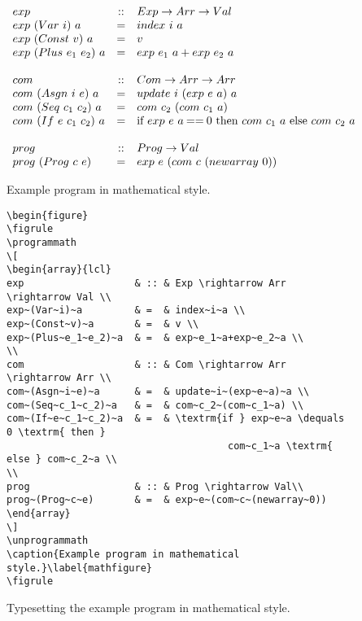 \documentclass{jfp}
\begin{document}
\begin{figure}
\figrule
\programmath
\[
\begin{array}{lcl}
exp                   & :: & Exp \rightarrow Arr \rightarrow Val \\
exp~(Var~i)~a         & =  & index~i~a \\
exp~(Const~v)~a       & =  & v \\
exp~(Plus~e_1~e_2)~a  & =  & exp~e_1~a+exp~e_2~a \\
\\
com                   & :: & Com \rightarrow Arr \rightarrow Arr \\
com~(Asgn~i~e)~a      & =  & update~i~(exp~e~a)~a \\
com~(Seq~c_1~c_2)~a   & =  & com~c_2~(com~c_1~a) \\
com~(If~e~c_1~c_2)~a  & =  & \textrm{if } exp~e~a \mathbin{==} 0 \textrm{ then }
                                      com~c_1~a \textrm{ else } com~c_2~a \\
\\
prog                  & :: & Prog \rightarrow Val\\
prog~(Prog~c~e)       & =  & exp~e~(com~c~(newarray~0))
\end{array}
\]
\unprogrammath
\caption{Example program in mathematical style.}\label{mathfigure}
\figrule
\begin{center}
\begin{verbatim}
\begin{figure}
\figrule
\programmath
\[
\begin{array}{lcl}
exp                   & :: & Exp \rightarrow Arr \rightarrow Val \\
exp~(Var~i)~a         & =  & index~i~a \\
exp~(Const~v)~a       & =  & v \\
exp~(Plus~e_1~e_2)~a  & =  & exp~e_1~a+exp~e_2~a \\
\\
com                   & :: & Com \rightarrow Arr \rightarrow Arr \\
com~(Asgn~i~e)~a      & =  & update~i~(exp~e~a)~a \\
com~(Seq~c_1~c_2)~a   & =  & com~c_2~(com~c_1~a) \\
com~(If~e~c_1~c_2)~a  & =  & \textrm{if } exp~e~a \dequals 0 \textrm{ then }
                                      com~c_1~a \textrm{ else } com~c_2~a \\
\\
prog                  & :: & Prog \rightarrow Val\\
prog~(Prog~c~e)       & =  & exp~e~(com~c~(newarray~0))
\end{array}
\]
\unprogrammath
\caption{Example program in mathematical style.}\label{mathfigure}
\figrule
\end{verbatim}
\end{center}
\caption{Typesetting the example program in mathematical style.}\label{mathtypeset}
\figrule
\end{figure}
\end{document}
